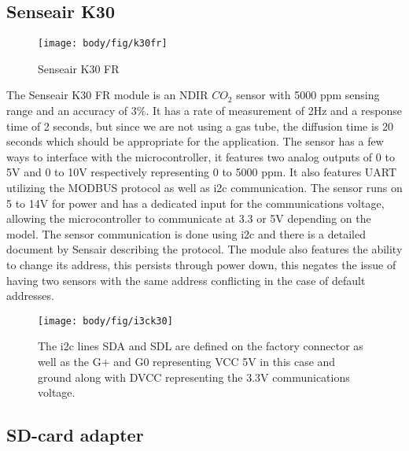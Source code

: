 \subsection{Senseair K30}
\begin{figure}[!htb]
	\centering
	\texttt{[image: body/fig/k30fr]}
	\caption{Senseair K30 FR}
	\label{fig:k30fr}
\end{figure}
The Senseair K30 FR module is an NDIR $ CO_2 $ sensor with 5000 ppm sensing range and an accuracy of 3\%. It has a rate of measurement of 2Hz and a response time of 2 seconds, but since we are not using a gas tube, the diffusion time is 20 seconds which should be appropriate for the application. The sensor has a few ways to interface with the microcontroller, it features two analog outputs of 0 to 5V and 0 to 10V respectively representing 0 to 5000 ppm. It also features UART utilizing the MODBUS protocol as well as i2c communication. The sensor runs on 5 to 14V for power and has a dedicated input for the communications voltage, allowing the microcontroller to communicate at 3.3 or 5V depending on the model. The sensor communication is done using i2c and there is a detailed document by Sensair describing the protocol. The module also features the ability to change its address, this persists through power down, this negates the issue of having two sensors with the same address conflicting in the case of default addresses. 
\begin{figure}[!htb]
	\centering
	\texttt{[image: body/fig/i3ck30]}
	\caption[i2c for K30]{The i2c lines SDA and SDL are defined on the factory connector as well as the G+ and G0 representing VCC 5V in this case and ground along with DVCC representing the 3.3V communications voltage.}
	\label{fig:i3ck30}
\end{figure}

 
\subsection{SD-card adapter}






